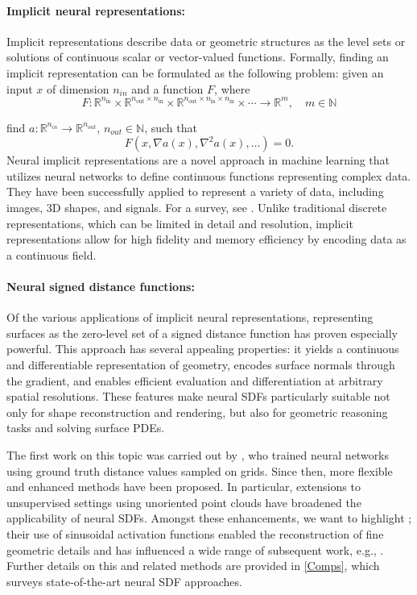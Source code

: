 \documentclass[draft,12pt,openany]{book}
\newcommand{\R}{\mathbb{R}}
\theoremstyle{plainnormal}
\theoremstyle{remark}
\begin{document}
\paragraph{Implicit neural representations:} 
Implicit representations describe data or geometric structures as the level sets or solutions of continuous scalar or vector-valued functions. Formally, finding an implicit representation can be formulated as the following problem: given an input $x$ of dimension $n_{in}$ and a function $F$, where
\[
F: \mathbb{R}^{n_{\text{in}}} \times \mathbb{R}^{n_{\text{out}} \times n_{\text{in}}} \times \mathbb{R}^{n_{\text{out}} \times n_{\text{in}} \times n_{\text{in}}} \times \cdots \rightarrow \mathbb{R}^m, \quad m \in \mathbb N
\]

find $a: \R^{n_{in}} \rightarrow \R^{n_{out}}$, $n_{{out}}\in \mathbb{N}$, such that $$F(x, \nabla a(x), \nabla^2a(x), \dots) = 0.$$ 
Neural implicit representations are a novel approach in machine learning that utilizes neural networks to define continuous functions representing complex data. They have been successfully applied to represent a variety of data, including images, 3D shapes, and signals. For a survey, see \cite{essakine2025standimplicitneuralrepresentations}. Unlike traditional discrete representations, which can be limited in detail and resolution, implicit representations allow for high fidelity and memory efficiency by encoding data as a continuous field.
  
\paragraph{Neural signed distance functions:}  
Of the various applications of implicit neural representations, representing surfaces as the zero-level set of a signed distance function has proven especially powerful.
This approach has several appealing properties: it yields a continuous and differentiable representation of geometry, encodes surface normals through the gradient, and enables efficient evaluation and differentiation at arbitrary spatial resolutions. These features make neural SDFs particularly suitable not only for shape reconstruction and rendering, but also for geometric reasoning tasks and solving surface PDEs.\par
The first work on this topic was carried out by \cite{park2019deepsdflearningcontinuoussigned}, who trained neural networks using ground truth distance values sampled on grids. Since then, more flexible and enhanced methods have been proposed. In particular, extensions to unsupervised settings using unoriented point clouds have broadened the applicability of neural SDFs. Amongst these enhancements, we want to highlight \cite{sitzmann2020implicitneuralrepresentationsperiodic}; their use of sinusoidal activation functions enabled the reconstruction of fine geometric details and has influenced a wide range of subsequent work, e.g., \cite{wang2023neuralsingularhessianimplicitneuralrepresentation}. Further details on this and related methods are provided in \cref{Comps}, which surveys state-of-the-art neural SDF approaches.
\end{document}
